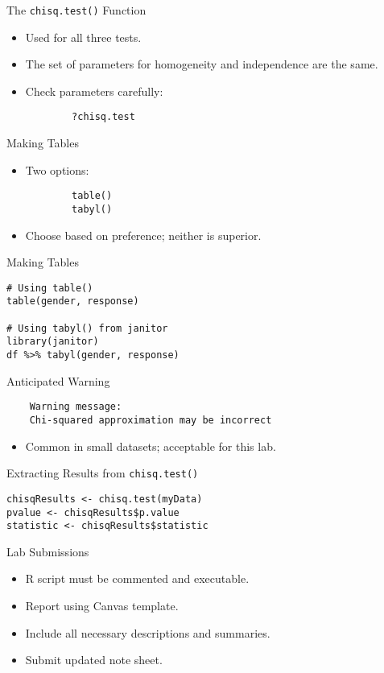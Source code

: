 \documentclass{beamer}
\begin{document}
\begin{frame}[fragile]{The \texttt{chisq.test()} Function}
    \begin{itemize}
        \item Used for all three tests.
        \item The set of parameters for homogeneity and independence are the same.
        \item Check parameters carefully:
        \begin{verbatim}
        ?chisq.test
        \end{verbatim}
    \end{itemize}
\end{frame}

\begin{frame}[fragile]{Making Tables}
    \begin{itemize}
        \item Two options:
        \begin{verbatim}
        table()
        tabyl()
        \end{verbatim}
        \item Choose based on preference; neither is superior.
    \end{itemize}
\end{frame}
\begin{frame}[fragile]{Making Tables}
\begin{verbatim}
# Using table()
table(gender, response)

# Using tabyl() from janitor
library(janitor)
df %>% tabyl(gender, response)
\end{verbatim}
\end{frame}
\begin{frame}[fragile]{Anticipated Warning}
    \begin{verbatim}
    Warning message:
    Chi-squared approximation may be incorrect
    \end{verbatim}
    \begin{itemize}
        \item Common in small datasets; acceptable for this lab.
    \end{itemize}
\end{frame}

\begin{frame}[fragile]{Extracting Results from \texttt{chisq.test()}}
\begin{verbatim}
chisqResults <- chisq.test(myData)
pvalue <- chisqResults$p.value
statistic <- chisqResults$statistic
\end{verbatim}
\end{frame}


\begin{frame}{Lab Submissions}
    \begin{itemize}
        \item R script must be commented and executable.
        \item Report using Canvas template.
        \item Include all necessary descriptions and summaries.
        \item Submit updated note sheet.
    \end{itemize}
\end{frame}
\end{document}
